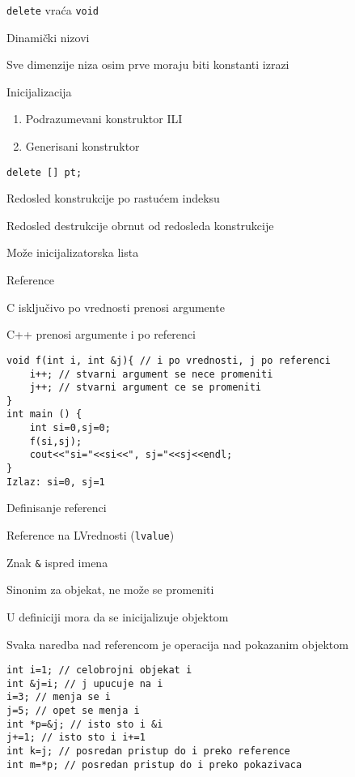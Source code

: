 \documentclass{article}
\newenvironment{xitemize}{%
    
    \itemize
    \larger
}{%
    \enditemize
}
\let\olditemize\itemize
\let\endolditemize\enditemize
\renewenvironment{itemize}{%
    \smaller
    \olditemize
}{%
    \endolditemize
}
\providecommand{\inlinecode}[1]{\texttt{#1}}
\begin{document}
\begin{xitemize}
\begin{itemize}
\begin{enumerate}
    \end{enumerate}
    \item \inlinecode {delete} vraća \inlinecode {void}
\end{itemize}
\item Dinamički nizovi
\begin{itemize}
    \item Sve dimenzije niza osim prve moraju biti konstanti izrazi
    \item Inicijalizacija
    \begin{enumerate}
        \item Podrazumevani konstruktor ILI
        \item Generisani konstruktor
    \end{enumerate}
    \inlinecode{delete [] pt;}
    \item Redosled konstrukcije po rastućem indeksu
    \item Redosled destrukcije obrnut od redosleda konstrukcije
    \item Može inicijalizatorska lista
\end{itemize}


\item Reference
\begin{itemize}
    \item C isključivo po vrednosti prenosi argumente
    \item C++ prenosi argumente i po referenci
    \begin{lstlisting}
void f(int i, int &j){ // i po vrednosti, j po referenci
    i++; // stvarni argument se nece promeniti
    j++; // stvarni argument ce se promeniti
}
int main () {
    int si=0,sj=0;
    f(si,sj);
    cout<<"si="<<si<<", sj="<<sj<<endl;
}
Izlaz: si=0, sj=1
    \end{lstlisting}
\end{itemize}
\item Definisanje referenci
\begin{itemize}
    \item Reference na LVrednosti (\inlinecode {lvalue})
    \item Znak \inlinecode\& ispred imena
    \item Sinonim za objekat, ne može se promeniti
    \item U definiciji mora da se inicijalizuje objektom
    \item Svaka naredba nad referencom je operacija nad pokazanim objektom
    \begin{lstlisting}
int i=1; // celobrojni objekat i
int &j=i; // j upucuje na i
i=3; // menja se i
j=5; // opet se menja i
int *p=&j; // isto sto i &i
j+=1; // isto sto i i+=1
int k=j; // posredan pristup do i preko reference
int m=*p; // posredan pristup do i preko pokazivaca
    \end{lstlisting}
\end{itemize}



\end{xitemize}
\end{document}
